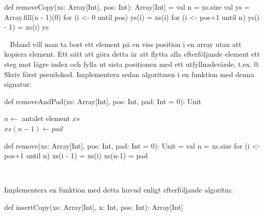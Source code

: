 \begin{Code}
def removeCopy(xs: Array[Int], pos: Int): Array[Int] = {
  val n = xs.size
  val ys = Array.fill(n - 1)(0)
  for (i <- 0 until pos) ys(i) = xs(i)
  for (i <- pos+1 until n) ys(i - 1) = xs(i)
  ys
}
\end{Code}

\QUESTEND





\QUESTBEGIN

\Task  \what~  Ibland vill man ta bort ett element på en viss position i en array utan att kopiera element. Ett sätt att göra detta är att flytta alla efterföljande element ett steg mot lägre index och fylla ut sista positionen med ett utfyllnadsvärde, t.ex. $0$.
Skriv först pseudokod. Implementera sedan algoritmen i en funktion med denna signatur:
\begin{Code}
def removeAndPad(xs: Array[Int], pos: Int, pad: Int = 0): Unit
\end{Code}

\SOLUTION

\TaskSolved \what

\begin{algorithm}[H]

 $n \leftarrow$ antalet element $xs$\\
 $xs(n - 1) \leftarrow pad$ \\
\end{algorithm}

\begin{Code}
def remove(xs: Array[Int], pos: Int, pad: Int = 0): Unit = {
  val n = xs.size
  for (i <- pos+1 until n) xs(i - 1) = xs(i)
  xs(n-1) = pad
}
\end{Code}

\QUESTEND





\QUESTBEGIN

\Task  \what~

\Subtask Implementera en funktion med detta huvud enligt efterföljande algoritm:
\begin{Code}
def insertCopy(xs: Array[Int], x: Int, pos: Int): Array[Int]
\end{Code}


